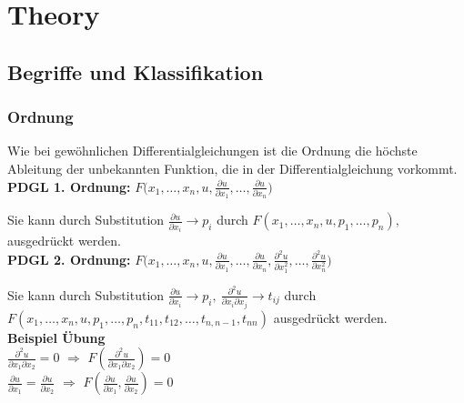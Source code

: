 \section{Theory}

\subsection{Begriffe und Klassifikation}

\subsubsection{Ordnung}

Wie bei gewöhnlichen Differentialgleichungen ist die Ordnung
die höchste Ableitung der unbekannten Funktion, die in der
Differentialgleichung vorkommt.\\

\textbf{PDGL 1. Ordnung: } \qquad$F\biggl(x_1,\dots,x_n, u, \frac{\partial u}{\partial x_1},\dots,\frac{\partial u}{\partial x_n}\biggr)$

Sie kann durch Substitution $\frac{\partial u}{\partial x_i}\to p_i$ durch  $F(x_1,\dots,x_n,u,p_1,\dots,p_n),$
ausgedrückt werden.\\

\textbf{PDGL 2. Ordnung: } \qquad $F\biggl(x_1,\dots,x_n,u,
\frac{\partial u}{\partial x_1},\dots,\frac{\partial u}{\partial x_n},
\frac{\partial^2 u}{\partial x_1^2},\dots,\frac{\partial^2 u}{\partial x_n^2}\biggr)$

Sie kann durch Substitution $\frac{\partial u}{\partial x_i}\to p_i,~\frac{\partial^2 u}{\partial x_i\partial x_j}\to t_{ij}$ durch
$F(x_1,\dots,x_n,u,p_1,\dots,p_n,t_{11},t_{12},\dots,t_{n,n-1},t_{nn})$
ausgedrückt werden.\\
\textbf{Beispiel Übung}\\
$\frac{\partial^2 u}{\partial x_1 \partial x_2} = 0$ $\Rightarrow$ $F \left(
\frac {\partial^2 u}{\partial x_1 \partial x_2} \right) = 0$\\
$\frac{\partial u}{\partial x_1} = \frac{\partial u}{\partial x_2} $
$\Rightarrow$ $F \left( \frac{\partial u}{\partial x_1}, \frac{\partial
u}{\partial x_2} \right) = 0$

